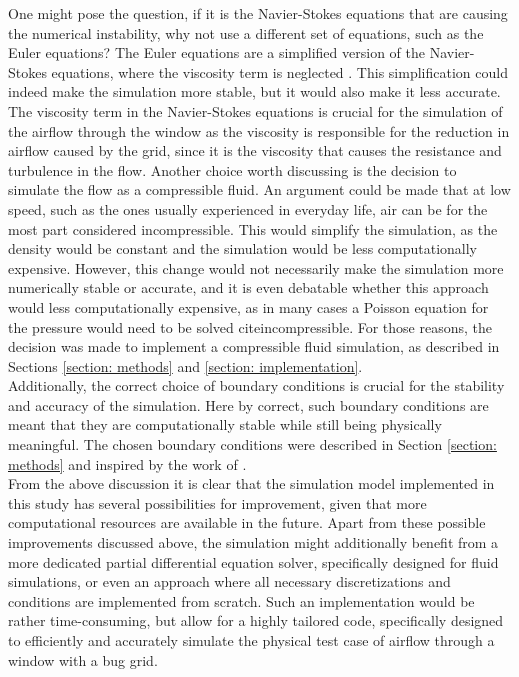 One might pose the question, if it is the Navier-Stokes equations that are causing the numerical instability, why not use a different set of equations, such as the Euler equations? The Euler equations are a simplified version of the Navier-Stokes equations, where the viscosity term is neglected \cite{eulerEqs}. This simplification could indeed make the simulation more stable, but it would also make it less accurate. The viscosity term in the Navier-Stokes equations is crucial for the simulation of the airflow through the window as the viscosity is responsible for the reduction in airflow caused by the grid, since it is the viscosity that causes the resistance and turbulence in the flow. Another choice worth discussing is the decision to simulate the flow as a compressible fluid. An argument could be made that at low speed, such as the ones usually experienced in everyday life, air can be for the most part considered incompressible. This would simplify the simulation, as the density would be constant and the simulation would be less computationally expensive. However, this change would not necessarily make the simulation more numerically stable or accurate, and it is even debatable whether this approach would less computationally expensive, as in many cases a Poisson equation for the pressure would need to be solved cite{incompressible}. For those reasons, the decision was made to implement a compressible fluid simulation, as described in Sections \ref{section: methods} and \ref{section: implementation}. \\

Additionally, the correct choice of boundary conditions is crucial for the stability and accuracy of the simulation. Here by correct, such boundary conditions are meant that they are computationally stable while still being physically meaningful. The chosen boundary conditions were described in Section \ref{section: methods} and inspired by the work of \cite{cfdBarbs}. \\

From the above discussion it is clear that the simulation model implemented in this study has several possibilities for improvement, given that more computational resources are available in the future. Apart from these possible improvements discussed above, the simulation might additionally benefit from a more dedicated partial differential equation solver, specifically designed for fluid simulations, or even an approach where all necessary discretizations and conditions are implemented from scratch. Such an implementation would be rather time-consuming, but allow for a highly tailored code, specifically designed to efficiently and accurately simulate the physical test case of airflow through a window with a bug grid. \\